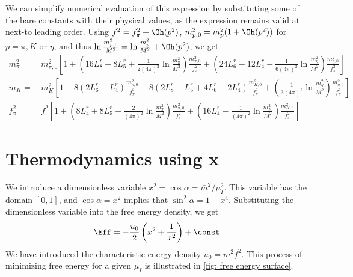 \documentclass{book}
\begin{document}
We can simplify numerical evaluation of this expression by substituting some of the bare constants with their physical values, as the expression remains valid at next-to leading order.
Using $f^2 = f_\pi^2 + \Oh(p^2)$, $m_{p,0}^2 = m_p^2(1 + \Oh(p^2))$ for $p = \pi, K $ or $\eta$, and thus $\ln \frac{m_{p,0}^2}{M^2} = \ln \frac{m_{p}^2}{M^2} + \Oh(p^2)$, we get
\begin{align}
    m_\pi^2 
    =&\, 
    m_{\pi,0}^2
    \left[
        1
        +
        \left(
            16L_8^r - 8L_5^r
            +
            \frac{1}{2(4\pi)^2}
            \ln\frac{m_{\pi}^2}{M^2}
        \right)\frac{m_{\pi,0}^2}{f_\pi^2}
        +
        \left(
            24L_6^r - 12L_4^r
            -
            \frac{1}{6(4\pi)^2}
            \ln\frac{m_{\eta}^2}{M^2}
        \right)\frac{m_{\eta,0}^2}{f_\pi^2}
    \right] \\
    m_{K}
    =&\,
    m_{K}^2
    \left[
        1
        + 8\left(2L_6^r - L_4^r\right) \frac{m_{\pi,0}^2}{f_\pi^2}
        + 8\left(2L_8^r - L_5^r + 4L_6^r- 2L_4^r\right) \frac{m_{K,0}^2}{f_\pi^2}
        +
        \left(
            \frac{1}{3(4 \pi)^2} \ln\frac{m_{\eta}^2}{M^2} 
        \right)
        \frac{m_{\eta,0}^2}{f_\pi^2}
    \right]\\
    f_\pi^2
    =&\, f^2
    \left[
        1
        + 
        \left(
            8 L_4^r + 8 L_5^r - \frac{2}{(4\pi)^2} \ln\frac{m_{\pi}^2}{M^2}
        \right) \frac{m_{\pi,0}^2}{f_\pi^2}
        +
        \left(
            16 L_4^r
            -\frac{1}{(4\pi)^2} \ln\frac{m_{K}^2}{M^2}
        \right) \frac{m_{K,0}^2}{f_\pi^2}
    \right]
\end{align}

\section{Thermodynamics using x}

We introduce a dimensionless variable $x^2 = \cos\alpha = \bar m^2 / \mu_I^2$.
This variable has the domain $[0, 1]$, and $\cos \alpha = x^2$ implies that $\sin^2 \alpha = 1 - x^4$.
Substituting the dimensionless variable into the free energy density, we get 
%
\begin{equation}
    \Eff = - \frac{u_0}{2} \left( x^2 + \frac{1}{x^2} \right) +\const
\end{equation}
%
We have introduced the characteristic energy density $u_0 = \bar m^2 f^2$.
This process of minimizing free energy for a given $\mu_I$ is illustrated in \autoref{fig: free energy surface}.
\end{document}
